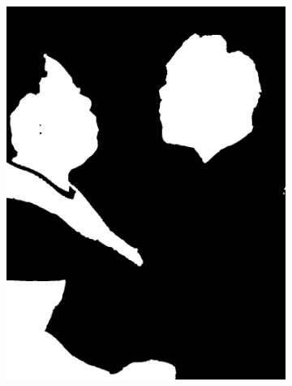 \begin{figure}[h]
{\begin{subfigure}[b]{0.23\textwidth}
         \includegraphics[width=\textwidth]{images/results/cross_st/mike_light_dark_y.png}
         \caption{}
     \end{subfigure}
    \hfill
     \begin{subfigure}[b]{0.23\textwidth}
         \centering

\end{subfigure}}
\end{figure}
